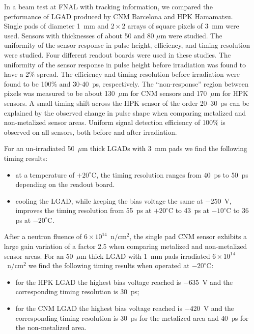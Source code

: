 \documentclass[preprint,1p]{elsarticle}
\begin{document}
In a beam test at FNAL with tracking information, we compared the performance of
LGAD produced by CNM Barcelona and HPK Hamamatsu. Single pads of diameter 1~mm
and $2\times 2$ arrays of square pixels of 3~mm were used. Sensors with
thicknesses of about 50 and 80 $\mu$m were studied. The uniformity of the
sensor response in pulse height, efficiency, and timing resolution
were studied. Four different readout boards 
were used in these studies. The uniformity of the
sensor response in pulse height before irradiation was found to have a
2\% spread. The efficiency and timing  resolution before irradiation
were found to be 100\%  and 30-40~\si{ps}, respectively. The
``non-response'' region between pixels was measured to be about 130~$\mu$m for CNM sensors 
and 170~$\mu$m for HPK sensors. 
A small timing shift across the HPK sensor of the order 20--30~\si{ps} can
be explained by the observed change in pulse shape when comparing metalized and
non-metalized sensor areas. Uniform signal detection efficiency of 100\% is
observed on all sensors, both before and after irradiation. 

For an un-irradiated 50~$\mu$m thick LGADs with 3~mm pads we find the following timing results: 
\begin{itemize}
  \item at a temperature of $+20^{\circ}$C, the timing resolution ranges from
        40~ps to 50~ps depending on the readout board. %
  \item cooling the LGAD, while keeping the bias voltage the same at $-250$~V,
        improves the timing resolution from 55~ps at $+20^{\circ}$C to 43~ps at
        $-10^{\circ}$C to 36 ps at $-20^{\circ}$C. \end{itemize}

After a neutron fluence of $6\times 10^{14}$~n/cm$^2$, the single pad CNM sensor
exhibits a large gain variation of a factor 2.5 when comparing metalized and
non-metalized sensor areas. For an 50~$\mu$m thick LGAD with 1~mm pads
irradiated $6\times 10^{14}$~n/cm$^2$ we find the following timing results when
operated at $-20^{\circ}$C: 

\begin{itemize}
  \item for the HPK LGAD the highest bias voltage reached is $-635$~V
    and the corresponding timing resolution is 30~ps; 
  \item for the CNM LGAD the highest bias voltage reached is $-420$~V
    and the corresponding
        timing resolution is 30~ps for the metalized area and $40$~ps for the
        non-metalized area.
\end{itemize}
\end{document}
